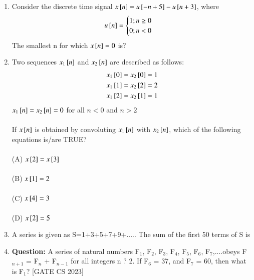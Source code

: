 \begin{enumerate}[label=\thechapter.\arabic*,ref=\thechapter.\theenumi]

\item Consider the discrete time signal $x{}\left[n\right] = u{}\left[-n+5\right] - u{}\left[n+3\right]$, where
\[u{}\left[n\right] = 
\begin{cases}
    1;n\geq0\\
    0;n<0
\end{cases}
\]
The smallest n for which $x{}\left[n\right] = 0$ is?
\\ \solution

\newpage
\item Two sequences $x_1{}\left[n\right] $ and $ x_2 {}\left[n\right]$ are described as follows:
\begin{align}
x_1{}\left[0\right] = x_2{}\left[0\right] = 1\\
x_1{}\left[1\right] = x_2{}\left[2\right] = 2\\
x_1{}\left[2\right] = x_2{}\left[1\right] = 1
\end{align}
$x_1{}\left[n\right] = x_2{}\left[n\right] = 0$ for all $n<0$ and $n>2$\\
\\
If $x{}\left[n\right]$ is obtained by convoluting $x_1{}\left[n\right]$ with $x_2{}\left[n\right]$, which of the following equations is/are TRUE?\\
\\
(A) $x{}\left[2\right] = x{}\left[3\right]$\\
\\
(B) $x{}\left[1\right] = 2$\\
\\
(C) $x{}\left[4\right] = 3$\\
\\
(D) $x{}\left[2\right] = 5$\\

\solution
\pagebreak
\item A series  is given as S=1+3+5+7+9+..... The sum of the first 50 terms of S is \underline{\hspace{1in}}
\solution
\pagebreak
\item \textbf{Question:} A series of natural numbers F$_1$, F$_2$, F$_3$, F$_4$, F$_5$, F$_6$, F$_7$,....obeys F$_{n+1}$ = F$_n$ + F$_{n-1}$ for all integers n ? 2.
	If F$_6$ = 37, and F$_7$ = 60, then what is F$_1$? \hfill[GATE CS 2023]\\
 \solution
 \pagebreak
\end{enumerate}
